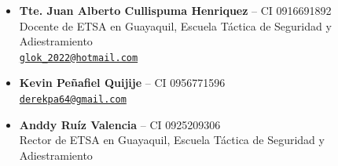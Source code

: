 \begin{itemize}[leftmargin=*,itemsep=0.35em,topsep=0.2em]
	\item
	\small{\textbf{Tte. Juan Alberto Cullispuma Henriquez} -- CI 0916691892 \\
	Docente de ETSA en Guayaquil, Escuela Táctica de Seguridad y Adiestramiento \\
	\href{mailto:glok_2022@hotmail.com}{\nolinkurl{glok_2022@hotmail.com}}}

	\item
	\small{\textbf{Kevin Peñafiel Quijije} -- CI 0956771596 \\
	\href{mailto:derekpa64@gmail.com}{\nolinkurl{derekpa64@gmail.com}}}

	\item
	\small{\textbf{Anddy Ruíz Valencia} -- CI 0925209306 \\
	Rector de ETSA en Guayaquil, Escuela Táctica de Seguridad y Adiestramiento}
\end{itemize}